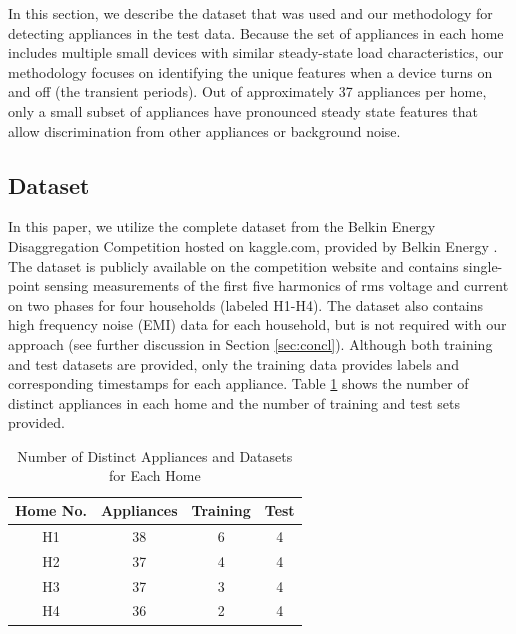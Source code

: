 \documentclass[conference]{IEEEtran}
\begin{document}
In this section, we describe the dataset that was used and our methodology for detecting appliances in the test data. Because the set of appliances in each home includes multiple small devices with similar steady-state load characteristics, our methodology focuses on identifying the unique features when a device turns on and off (the transient periods).  Out of approximately 37 appliances per home, only a small subset of appliances have pronounced steady state features that allow discrimination from other appliances or background noise.   

\subsection{Dataset}

In this paper, we utilize the complete dataset from the Belkin Energy Disaggregation Competition hosted on kaggle.com, provided by Belkin Energy \cite{Kaggle}.  The dataset is publicly available on the competition website and contains single-point sensing measurements of the first five harmonics of rms voltage and current on two phases for four households (labeled H1-H4). The dataset also contains high frequency noise (EMI) data for each household, but is not required with our approach (see further discussion in Section \ref{sec:concl}).  Although both training and test datasets are provided, only the training data provides labels and corresponding timestamps for each appliance. Table \ref{table:dataset} shows the number of distinct appliances in each home and the number of training and test sets provided. 

\begin{table}[!t]
	\renewcommand{\arraystretch}{1.3}
	\caption{Number of Distinct Appliances and Datasets for Each Home}\label{classes}
	\label{table:dataset}
	\centering
	\begin{tabular}{c||c||c||c}
		\hline 
		\textbf{Home No.} & \textbf{Appliances} &\textbf{Training} &\textbf{Test}\tabularnewline
		\hline 
		\hline 
		H1 & 38 & 6 & 4\tabularnewline
		\hline 
		H2 & 37 & 4 & 4\tabularnewline
		\hline 
		H3 & 37 & 3 & 4\tabularnewline
		\hline 
		H4 & 36 & 2 & 4\tabularnewline
		\hline 
	\end{tabular}
\end{table}
\end{document}
